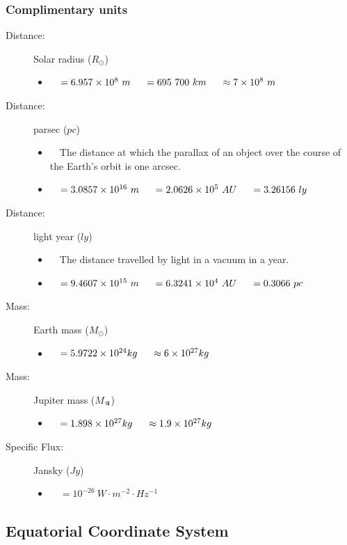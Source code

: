 \documentclass[]{report}
\newcommand \tab[1][1cm]{\hspace*{#1}}
\newcommand{\items}{\item\ \ }
\begin{document}
\subsubsection{Complimentary units}

\begin{description}
\item[Distance:] Solar radius ($R_\odot$)
\begin{itemize}
\items $=6.957 \times 10^8\ m \tab[0.5cm]= 695\ 700\ km \tab[0.5cm] \approx 7 \times 10^8\ m$	
\end{itemize}

\item[Distance:] parsec ($pc$)
\begin{itemize}
\items The distance at which the parallax of an object over the course of the Earth's orbit is one arcsec.
\items $= 3.0857 \times 10^{16}\ m \tab[0.5cm]= 2.0626 \times 10^5\ AU \tab[0.5cm]= 3.26156\ ly$
\end{itemize}

\item[Distance:] light year ($ly$)
\begin{itemize}
\items The distance travelled by light in a vacuum in a year.
\items $= 9.4607 \times 10^{15}\ m \tab[0.5cm] = 6.3241 \times 10^4\ AU \tab[0.5cm]= 0.3066\ pc$
\end{itemize}

\item[Mass:] Earth mass ($M_\odot$)
\begin{itemize}
\items $= 5.9722 \times 10^{24} kg \tab[0.5cm] \approx 6 \times 10^{27} kg $
\end{itemize}

\item[Mass:] Jupiter mass ($M_{\jupiter}$)
\begin{itemize}
\items $= 1.898 \times 10^{27} kg \tab[0.5cm] \approx 1.9 \times 10^{27} kg $
\end{itemize}
                
\item[Specific Flux:] Jansky ($Jy$)
\begin{itemize}
\items $= 10^{-26}\ W\cdot m^{-2} \cdot Hz^{-1}$
\end{itemize}
\end{description}

\subsection{Equatorial Coordinate System}
\end{document}
